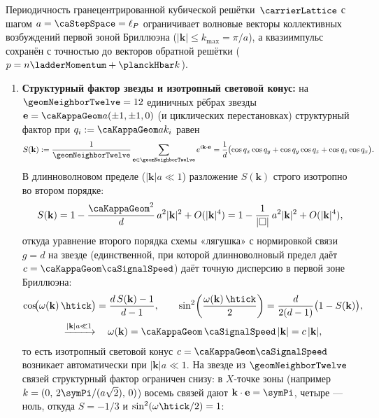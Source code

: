Периодичность гранецентрированной кубической решётки~$\carrierLattice$ с шагом $a = \caStepSpace = \ell_P$ ограничивает волновые векторы коллективных возбуждений первой зоной Бриллюэна ($|\mathbf{k}|\le k_{\max}=\pi/a$), а квазиимпульс сохранён с точностью до векторов обратной решётки ($p = n\ladderMomentum + \planckHbar k$).

\begin{theorem}
\label{thm:fcc-dispersion-bose}
\begin{enumerate}[leftmargin=*]
\item \textbf{Структурный фактор звезды и изотропный световой конус:}
  на $\geomNeighborTwelve = 12$ единичных рёбрах звезды $\mathbf{e} = \caKappaGeom a(\pm 1,\pm 1,0)$ (и циклических перестановках) структурный фактор при $q_i := \caKappaGeom a k_i$ равен
  \[
    S(\mathbf{k}) := \frac{1}{\geomNeighborTwelve}\sum_{\mathbf{e}\in\geomNeighborTwelve} e^{i\mathbf{k}\cdot\mathbf{e}}
    = \frac{1}{d}\bigl(\cos q_x\cos q_y + \cos q_y\cos q_z + \cos q_z\cos q_x\bigr).
  \]
  В длинноволновом пределе ($|\mathbf{k}|a\ll 1$) разложение $S(\mathbf{k})$ строго изотропно во втором порядке:
  \[
    S(\mathbf{k}) = 1 - \frac{\caKappaGeom^2}{d}\,a^2|\mathbf{k}|^2 + O(|\mathbf{k}|^4)
    = 1 - \frac{1}{|\square|}\,a^2|\mathbf{k}|^2 + O(|\mathbf{k}|^4),
  \]
  откуда уравнение второго порядка схемы «лягушка» с нормировкой связи $g = d$ на звезде
  (единственной, при которой длинноволновый предел даёт $c = \caKappaGeom\caSignalSpeed$)
  даёт точную дисперсию в первой зоне Бриллюэна:
  \begin{equation}
  \label{eq:fcc-exact-dispersion}
  \begin{gathered}
    \cos\!\bigl(\omega(\mathbf{k})\,\htick\bigr) = \frac{d\,S(\mathbf{k}) - 1}{d - 1},
    \qquad
    \sin^2\!\left(\frac{\omega(\mathbf{k})\,\htick}{2}\right) = \frac{d}{2(d-1)}\bigl(1 - S(\mathbf{k})\bigr),\\
    \xrightarrow{|\mathbf{k}|a\ll 1}\quad
    \omega(\mathbf{k}) = \caKappaGeom\,\caSignalSpeed\,|\mathbf{k}| = c\,|\mathbf{k}|,
  \end{gathered}
  \end{equation}
  то есть изотропный световой конус $c = \caKappaGeom\caSignalSpeed$ возникает автоматически при $|\mathbf{k}|a\ll 1$.
  На звезде из $\geomNeighborTwelve$ связей структурный фактор ограничен снизу:
  в $X$-точке зоны (например $k = (0,\,2\symPi/(a\sqrt{2}),\,0)$) восемь связей дают $\mathbf{k}\cdot\mathbf{e} = \symPi$,
  четыре --- ноль, откуда $S = -1/3$ и $\sin^2(\omega\htick/2) = 1$:

\end{enumerate}
\end{theorem}
